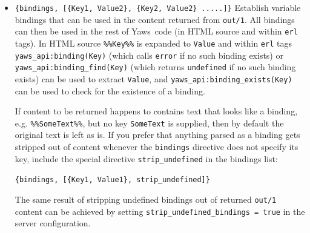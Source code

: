 \documentclass[11pt,oneside,english]{book}
\newcommand{\Yaws}            %
        {{\sc Yaws}}
\begin{document}
\begin{itemize}
   \begin{itemize}
     \item \verb+Delimiter = %%+

     \item File contains the string \verb+.... %%xyz%%  .....+

     \item Bindings contain the tuple \verb+{"xyz", "Dingbat"}+
   \end{itemize}

  The occurrence of \verb+%%xyz%%+ in \verb+File+ will be replaced with
  \verb+"Dingbat"+ in the server-side included output.

  The \verb+{ssi, File, Delimiter, Bindings}+ statement can also occur
  within a deep ehtml structure.

  The special directive \verb+strip_undefined+ can be specified in the
  \verb+Bindings+ list, just as it can for the \verb+{bindings, ....}+
  directive, but it's ignored because treating undefined variables as
  empty is the default for \verb+ssi+ bindings.

\item \verb+{bindings, [{Key1, Value2}, {Key2, Value2} .....]}+ Establish variable
  bindings that can be used in the content returned from
  \verb+out/1+. All bindings can then be used in the rest of
  \Yaws\ code (in HTML source and within \verb+erl+ tags).  In HTML
  source \verb+%%Key%%+ is expanded to \verb+Value+ and within
  \verb+erl+ tags \verb+yaws_api:binding(Key)+ (which calls
  \verb+error+ if no such binding exists) or
  \verb+yaws_api:binding_find(Key)+ (which returns \verb+undefined+ if
  no such binding exists) can be used to extract \verb+Value+, and
  \verb+yaws_api:binding_exists(Key)+ can be used to check for the
  existence of a binding.

  If content to be returned happens to contains text that looks like a
  binding, e.g.  \verb+%%SomeText%%+, but no key \verb+SomeText+ is
  supplied, then by default the original text is left as is. If you
  prefer that anything parsed as a binding gets stripped out of
  content whenever the \verb+bindings+ directive does not specify its
  key, include the special directive \verb+strip_undefined+ in the
  bindings list:

  \verb+{bindings, [{Key1, Value1}, strip_undefined]}+

  The same result of stripping undefined bindings out of returned
  \verb+out/1+ content can be achieved by setting
  \verb+strip_undefined_bindings = true+ in the server configuration.


\end{itemize}
\end{document}
